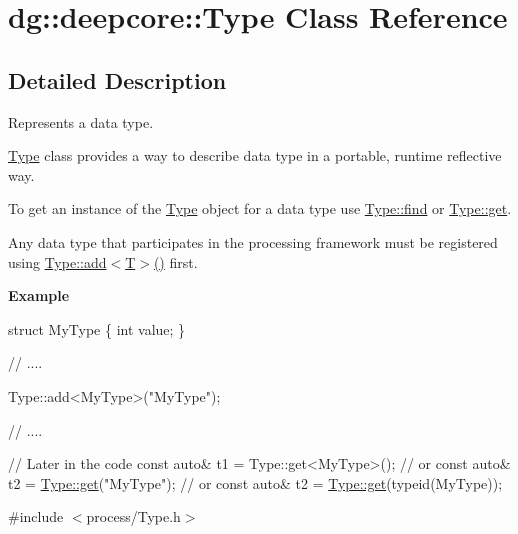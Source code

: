 \hypertarget{classdg_1_1deepcore_1_1_type}{}\section{dg\+:\+:deepcore\+:\+:Type Class Reference}
\label{classdg_1_1deepcore_1_1_type}


\subsection{Detailed Description}
Represents a data type. 

\hyperlink{classdg_1_1deepcore_1_1_type}{Type} class provides a way to describe data type in a portable, runtime reflective way.

To get an instance of the \hyperlink{classdg_1_1deepcore_1_1_type}{Type} object for a data type use \hyperlink{classdg_1_1deepcore_1_1_type_aa142909be95af134c6edf1430de91ed7}{Type\+::find} or \hyperlink{classdg_1_1deepcore_1_1_type_a91d379388e31f698a98fefbc3eb49d2e}{Type\+::get}.

Any data type that participates in the processing framework must be registered using \hyperlink{classdg_1_1deepcore_1_1_type_a50fd91c6f02c14e8ee2683e99783c329}{Type\+::add$<$\+T$>$()} first.

{\bfseries Example} 
\begin{DoxyCode}
\textcolor{keyword}{struct }MyType
\{
    \textcolor{keywordtype}{int} value;
\}

\textcolor{comment}{// ....}

Type::add<MyType>(\textcolor{stringliteral}{"MyType"});

\textcolor{comment}{// ....}

\textcolor{comment}{// Later in the code}
\textcolor{keyword}{const} \textcolor{keyword}{auto}& t1 = Type::get<MyType>();
\textcolor{comment}{// or}
\textcolor{keyword}{const} \textcolor{keyword}{auto}& t2 = \hyperlink{classdg_1_1deepcore_1_1_type_a031153725e4e277bafe43ebc8178afff}{Type::get}(\textcolor{stringliteral}{"MyType"});
\textcolor{comment}{// or}
\textcolor{keyword}{const} \textcolor{keyword}{auto}& t2 = \hyperlink{classdg_1_1deepcore_1_1_type_a031153725e4e277bafe43ebc8178afff}{Type::get}(\textcolor{keyword}{typeid}(MyType));
\end{DoxyCode}
 

{\ttfamily \#include $<$process/\+Type.\+h$>$}

